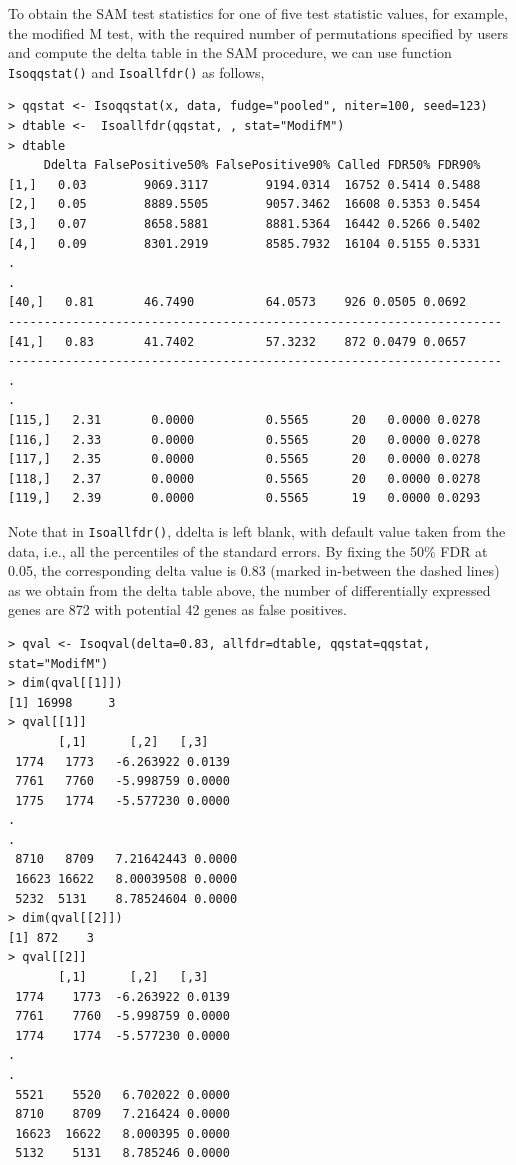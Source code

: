 To obtain the SAM test statistics for one of five test statistic values, for example, the modified M test,
with the required number of permutations specified by users and compute the
delta table in the SAM procedure, we can use function \texttt{Isoqqstat()} and \texttt{Isoallfdr()} as follows,
\begin{center}
\begin{boxit}
\begin{verbatim}
> qqstat <- Isoqqstat(x, data, fudge="pooled", niter=100, seed=123)
> dtable <-  Isoallfdr(qqstat, , stat="ModifM")
> dtable
     Ddelta FalsePositive50% FalsePositive90% Called FDR50% FDR90%
[1,]   0.03        9069.3117        9194.0314  16752 0.5414 0.5488
[2,]   0.05        8889.5505        9057.3462  16608 0.5353 0.5454
[3,]   0.07        8658.5881        8881.5364  16442 0.5266 0.5402
[4,]   0.09        8301.2919        8585.7932  16104 0.5155 0.5331
.
.
[40,]   0.81       46.7490          64.0573    926 0.0505 0.0692
---------------------------------------------------------------------
[41,]   0.83       41.7402          57.3232    872 0.0479 0.0657
---------------------------------------------------------------------
.
.
[115,]   2.31       0.0000          0.5565      20   0.0000 0.0278
[116,]   2.33       0.0000          0.5565      20   0.0000 0.0278
[117,]   2.35       0.0000          0.5565      20   0.0000 0.0278
[118,]   2.37       0.0000          0.5565      20   0.0000 0.0278
[119,]   2.39       0.0000          0.5565      19   0.0000 0.0293
\end{verbatim}
\end{boxit}
\end{center}
Note that in \texttt{Isoallfdr()}, ddelta is left blank, with default value taken
from the data, i.e., all the percentiles of the standard errors.
By fixing the 50\% FDR at 0.05, the corresponding delta value is 0.83
(marked in-between the dashed lines) as we obtain from the delta table above,
the number of differentially expressed genes are 872 with potential 42 genes as false positives.



\begin{center}
\begin{boxit}
\begin{verbatim}
> qval <- Isoqval(delta=0.83, allfdr=dtable, qqstat=qqstat,
stat="ModifM")
> dim(qval[[1]])
[1] 16998     3
> qval[[1]]
       [,1]      [,2]   [,3]
 1774   1773   -6.263922 0.0139
 7761   7760   -5.998759 0.0000
 1775   1774   -5.577230 0.0000
.
.
 8710   8709   7.21642443 0.0000
 16623 16622   8.00039508 0.0000
 5232  5131    8.78524604 0.0000
> dim(qval[[2]])
[1] 872    3
> qval[[2]]
       [,1]      [,2]   [,3]
 1774    1773  -6.263922 0.0139
 7761    7760  -5.998759 0.0000
 1774    1774  -5.577230 0.0000
.
.
 5521    5520   6.702022 0.0000
 8710    8709   7.216424 0.0000
 16623  16622   8.000395 0.0000
 5132    5131   8.785246 0.0000
\end{verbatim}
\end{boxit}
\end{center}

